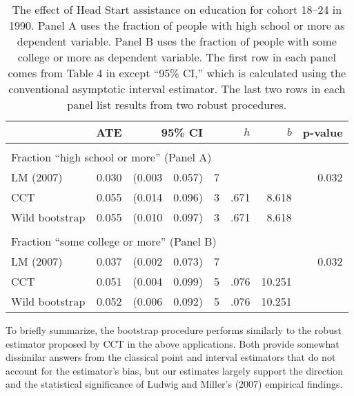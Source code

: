 \documentclass[12pt,fleqn]{article}
\begin{document}
\begin{table}[t]
  \centering
  \begin{tabular}{lrr@{, }rr@{}rrr}
    \toprule
                   & ATE   & \multicolumn{2}{r}{95\% CI} & & $h$     & $b$ & p-value     \\
    \midrule                                                                          \\
    \multicolumn{5}{l}{Fraction ``high school or more'' (Panel A)}                    \\
    \midrule
    LM (2007)      & 0.030 & (0.003                      & 0.057) & 7&     &  & 0.032    \\
    CCT            & 0.055 & (0.014                      & 0.096) & 3&.671 & 8.618       \\
    Wild bootstrap & 0.055 & (0.010                      & 0.097) & 3&.671 & 8.618       \\\\
    \multicolumn{5}{l}{Fraction ``some college or more'' (Panel B)}                   \\
    \midrule
    LM (2007)      & 0.037 & (0.002                      & 0.073) & 7&     &  & 0.032 \T \\
    CCT            & 0.051 & (0.004                      & 0.099) & 5&.076 & 10.251      \\
    Wild bootstrap & 0.052 & (0.006                      & 0.092) & 5&.076 & 10.251      \\
    \bottomrule
  \end{tabular}
  \caption{The effect of Head Start assistance on education for cohort
    18--24 in 1990. Panel A uses the fraction of people with high school
    or more as dependent variable. Panel B uses the fraction of people
    with some college or more as dependent variable. The first row in
    each panel comes from Table 4 in \cite{ludwig2007} except ``95\% CI,''
    which is calculated using the conventional asymptotic interval estimator.
    The last two rows in
    each panel list results from two robust procedures.}
  \label{tbl:3}
\end{table}

To briefly summarize, the bootstrap procedure performs similarly to the robust
estimator proposed by CCT in the above applications. Both provide somewhat
dissimilar answers from the classical point and interval estimators that do
not account for the estimator's bias, but our estimates largely support the
direction and the statistical significance of Ludwig and Miller's (2007)
empirical findings.
\end{document}

